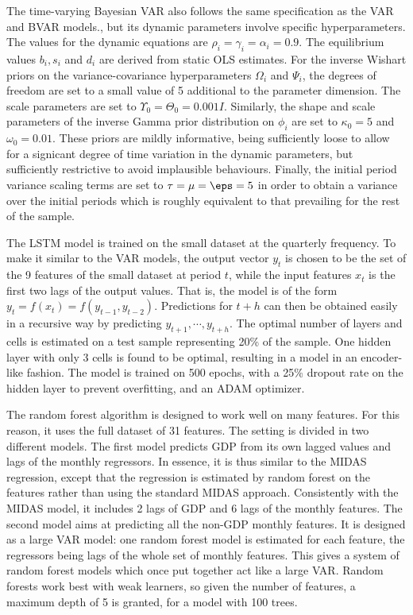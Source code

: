 The time-varying Bayesian VAR also follows the same specification as the VAR and BVAR models., but its dynamic parameters involve specific hyperparameters. The values for the dynamic equations are $\rho_i = \gamma_i = \alpha_i = 0.9$. The equilibrium values $b_i, s_i$ and $d_i$ are derived from static OLS estimates. For the inverse Wishart priors on the variance-covariance hyperparameters $\Omega_i$ and $\Psi_i$, the degrees of freedom are set to a small value of 5 additional to the parameter dimension. The scale parameters are set to $\Upsilon_0 = \Theta_0 = 0.001 I$. Similarly, the shape and scale parameters of the inverse Gamma prior distribution on $\phi_i$ are set to $\kappa_0 = 5$ and $\omega_0 = 0.01$. These priors are mildly informative, being sufficiently loose to allow for a signicant degree of time variation in the dynamic parameters, but sufficiently restrictive to avoid implausible behaviours. Finally, the initial period variance scaling terms are set to $\tau = \mu = \eps = 5$ in order to obtain a variance over the initial periods which is roughly equivalent to that prevailing for the rest of the sample.

The LSTM model is trained on the small dataset at the quarterly frequency. To make it similar to the VAR models, the output vector $y_t$ is chosen to be the set of the 9 features of the small dataset at period $t$, while the input features $x_t$ is the first two lags of the output values. That is, the model is of the form $y_t = f(x_t) = f(y_{t-1}, y_{t-2})$. Predictions for $t+h$ can then be obtained easily in a recursive way by predicting $y_{t+1}, \cdots, y_{t+h}$. The optimal number of layers and cells is estimated on a test sample representing 20\% of the sample. One hidden layer with only 3 cells is found to be optimal, resulting in a model in an encoder-like fashion. The model is trained on 500 epochs, with a 25\% dropout rate on the hidden layer to prevent overfitting, and an ADAM optimizer.

The random forest algorithm is designed to work well on many features. For this reason, it uses the full dataset of 31 features. The setting is divided in two different models. The first model predicts GDP from its own lagged values and lags of the monthly regressors. In essence, it is thus similar to the MIDAS regression, except that the regression is estimated by random forest on the features rather than using the standard MIDAS approach. Consistently with the MIDAS model, it includes 2 lags of GDP and 6 lags of the monthly features. The second model aims at predicting all the non-GDP monthly features. It is designed as a large VAR model: one random forest model is estimated for each feature, the regressors being lags of the whole set of monthly features. This gives a system of random forest models which once put together act like a large VAR. Random forests work best with weak learners, so given the number of features, a maximum depth of 5 is granted, for a model with 100 trees.

